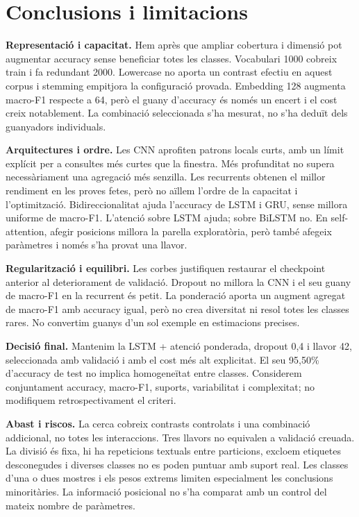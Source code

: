 \documentclass[11pt,a4paper]{article}
\begin{document}
\newpage
\section{Conclusions i limitacions}
\textbf{Representació i capacitat.} Hem après que ampliar cobertura i dimensió pot augmentar accuracy sense beneficiar totes les classes. Vocabulari 1000 cobreix train i fa redundant 2000. Lowercase no aporta un contrast efectiu en aquest corpus i stemming empitjora la configuració provada. Embedding 128 augmenta macro-F1 respecte a 64, però el guany d'accuracy és només un encert i el cost creix notablement. La combinació seleccionada s'ha mesurat, no s'ha deduït dels guanyadors individuals.

\textbf{Arquitectures i ordre.} Les CNN aprofiten patrons locals curts, amb un límit explícit per a consultes més curtes que la finestra. Més profunditat no supera necessàriament una agregació més senzilla. Les recurrents obtenen el millor rendiment en les proves fetes, però no aïllem l'ordre de la capacitat i l'optimització. Bidireccionalitat ajuda l'accuracy de LSTM i GRU, sense millora uniforme de macro-F1. L'atenció sobre LSTM ajuda; sobre BiLSTM no. En self-attention, afegir posicions millora la parella exploratòria, però també afegeix paràmetres i només s'ha provat una llavor.

\textbf{Regularització i equilibri.} Les corbes justifiquen restaurar el checkpoint anterior al deteriorament de validació. Dropout no millora la CNN i el seu guany de macro-F1 en la recurrent és petit. La ponderació aporta un augment agregat de macro-F1 amb accuracy igual, però no crea diversitat ni resol totes les classes rares. No convertim guanys d'un sol exemple en estimacions precises.

\textbf{Decisió final.} Mantenim la LSTM + atenció ponderada, dropout 0,4 i llavor 42, seleccionada amb validació i amb el cost més alt explicitat. El seu 95,50\% d'accuracy de test no implica homogeneïtat entre classes. Considerem conjuntament accuracy, macro-F1, suports, variabilitat i complexitat; no modifiquem retrospectivament el criteri.

\textbf{Abast i riscos.} La cerca cobreix contrasts controlats i una combinació addicional, no totes les interaccions. Tres llavors no equivalen a validació creuada. La divisió és fixa, hi ha repeticions textuals entre particions, excloem etiquetes desconegudes i diverses classes no es poden puntuar amb suport real. Les classes d'una o dues mostres i els pesos extrems limiten especialment les conclusions minoritàries. La informació posicional no s'ha comparat amb un control del mateix nombre de paràmetres.
\end{document}
